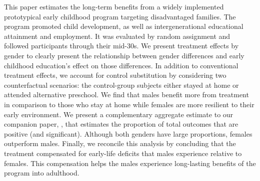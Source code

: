 \noindent This paper estimates the long-term benefits from a widely implemented prototypical early childhood program targeting disadvantaged families. The program promoted child development, as well as intergenerational educational attainment and employment. It was evaluated by random assignment and followed participants through their mid-30s. We present treatment effects by gender to clearly present the relationship between gender differences and early childhood education's effect on those differences. In addition to conventional treatment effects, we account for control substitution by considering two counterfactual scenarios: the control-group subjects either stayed at home or attended alternative preschool. We find that males benefit more from treatment in comparison to those who stay at home while females are more resilient to their early environment. We present a complementary aggregate estimate to our companion paper, \citet{Garcia_Heckman_Leaf_etal_2017_Comp_CBA_Unpublished}, that estimates the proportion of total outcomes that are positive (and significant). Although both genders have large proportions, females outperform males. Finally, we reconcile this analysis by concluding that the treatment compensated for early-life deficits that males experience relative to females. This compensation helps the males experience long-lasting benefits of the program into adulthood.
